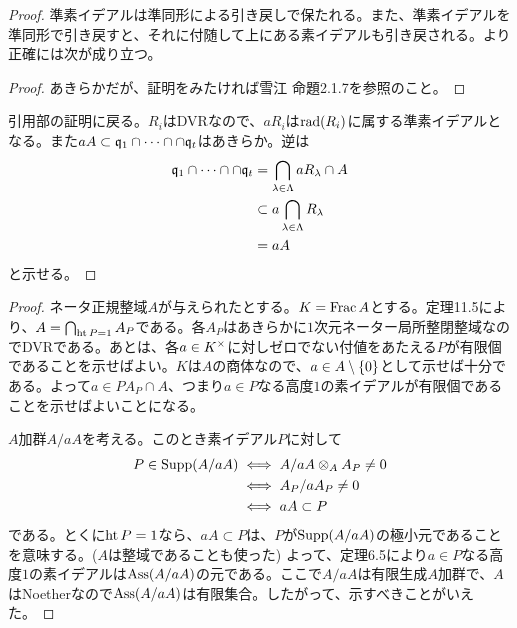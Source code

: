 \begin{proof}
  準素イデアルは準同形による引き戻しで保たれる。また、準素イデアルを準同形で引き戻すと、それに付随して上にある素イデアルも引き戻される。より正確には次が成り立つ。
  \begin{proof}
    あきらかだが、証明をみたければ雪江\cite{雪江3} 命題2.1.7を参照のこと。
  \end{proof}
  引用部の証明に戻る。$R_i$はDVRなので、$aR_i$は$\operatorname{rad} (R_i)$に属する準素イデアルとなる。また$aA \subset \mathfrak{q}_1 \cap \cdots \cap \cap \mathfrak{q}_t$はあきらか。逆は
  \begin{align*}
  \mathfrak{q}_1 \cap \cdots \cap \cap \mathfrak{q}_t &= \bigcap_{{\lambda} \in {\Lambda}} a R_{{\lambda}} \cap A \\
  &\subset a \bigcap_{{\lambda} \in {\Lambda}} R_{{\lambda}} \\
  &= aA
  \end{align*}
  と示せる。
\end{proof}


\begin{proof}
  ネータ正規整域$A$が与えられたとする。$K = \operatorname{Frac} A$とする。定理11.5により、$A = \bigcap_{\operatorname{ht} P = 1} A_P$である。各$A_P$はあきらかに$1$次元ネーター局所整閉整域なのでDVRである。あとは、各$a \in K^{\times}$に対しゼロでない付値をあたえる$P$が有限個であることを示せばよい。$K$は$A$の商体なので、$a \in A \setminus \{0\}$として示せば十分である。よって$a \in P A_P \cap A$、つまり$a \in P$なる高度$1$の素イデアルが有限個であることを示せばよいことになる。

  $A$加群$A/aA$を考える。このとき素イデアル$P$に対して
  \begin{align*}
    P \in \operatorname{Supp}(A/aA) &\iff A/aA \otimes_A A_P \neq 0 \\
    &\iff A_P / a A_P \neq 0 \\
    &\iff aA \subset P
  \end{align*}
  である。とくに$\operatorname{ht} P=1$なら、$aA \subset P$は、$P$が$\operatorname{Supp}(A/aA)$の極小元であることを意味する。($A$は整域であることも使った) よって、定理6.5により$a \in P$なる高度$1$の素イデアルは$\operatorname{Ass}(A/aA)$の元である。ここで$A/aA$は有限生成$A$加群で、$A$はNoetherなので$\operatorname{Ass}(A/aA)$は有限集合。したがって、示すべきことがいえた。
\end{proof}


